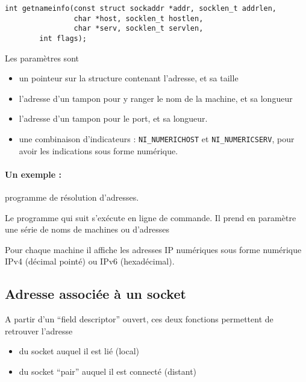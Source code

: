 \extrait
\begin{lstlisting}
int getnameinfo(const struct sockaddr *addr, socklen_t addrlen,
                char *host, socklen_t hostlen,
                char *serv, socklen_t servlen, 
		int flags);
\end{lstlisting}


Les paramètres sont

\begin{itemize}
\item un pointeur sur la structure contenant l'adresse, et sa taille
\item l'adresse d'un tampon pour y ranger le nom de la machine, et sa longueur
\item l'adresse d'un tampon pour le port, et sa longueur.
\item une combinaison d'indicateurs : \texttt{NI\_NUMERICHOST} et
  \texttt{NI\_NUMERICSERV}, pour avoir les indications sous forme
  numérique.
\end{itemize}

\paragraph{Un exemple :} programme de résolution d'adresses.

Le programme qui suit s'exécute en ligne de commande.
Il prend en paramètre une série de noms de machines ou d'adresses

Pour chaque machine il affiche les adresses IP numériques
sous forme numérique IPv4 (décimal pointé) ou IPv6 (hexadécimal).


\source




\subsection{Adresse associée à un socket}


A partir d'un ``field descriptor'' ouvert, ces deux fonctions
permettent de retrouver l'adresse

\begin{itemize}
\item du socket auquel il est lié (local)
\item du socket ``pair'' auquel il est connecté (distant)
\end{itemize}




